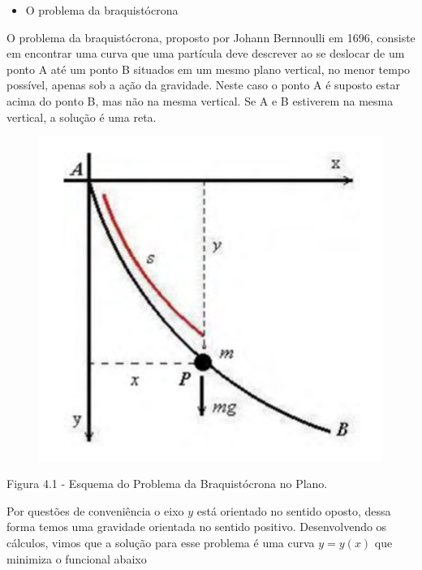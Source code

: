 \documentclass[12pt, a4paper]{article}
\begin{document}
\begin{itemize}
\item O problema da braquistócrona
\end{itemize}

O problema da braquistócrona, proposto por Johann Bernnoulli em 1696, consiste em encontrar uma curva que uma partícula deve descrever ao se deslocar de um ponto A até um ponto B situados em um mesmo plano vertical, no menor tempo possível, apenas sob a ação da gravidade. Neste caso o ponto A é suposto estar acima do ponto B, mas não na mesma vertical. Se A e B estiverem na mesma vertical, a solução é uma reta.


\begin{center}
\begin{figure}[!h]
	\centering
    \includegraphics[scale=0.6]{imgs/braquistocrona.png}

  \end{figure}

Figura 4.1 - Esquema do Problema da Braquistócrona no Plano.

\end{center}

Por questões de conveniência o eixo $y$ está orientado no sentido oposto, dessa forma temos uma gravidade orientada no sentido positivo. Desenvolvendo os cálculos, vimos que a solução para esse problema é uma curva $y=y(x)$ que minimiza o funcional abaixo
\end{document}
